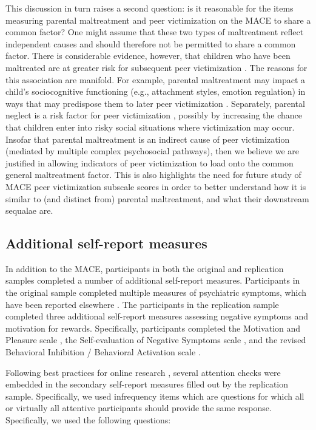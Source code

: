 \documentclass[letterpaper,man,natbib,longtable,floatsintext,12pt]{apa6}
\begin{document}
This discussion in turn raises a second question: is it reasonable for the items measuring parental maltreatment and peer victimization on the MACE to share a common factor? One might assume that these two types of maltreatment reflect independent causes and should therefore not be permitted to share a common factor. There is considerable evidence, however, that children who have been maltreated are at greater risk for subsequent peer victimization . The reasons for this association are manifold. For example, parental maltreatment may impact a child's sociocognitive functioning (e.g., attachment styles, emotion regulation) in ways that may predispose them to later peer victimization . Separately, parental neglect is a risk factor for peer victimization , possibly by increasing the chance that children enter into risky social situations where victimization may occur. Insofar that parental maltreatment is an indirect cause of peer victimization (mediated by multiple complex psychosocial pathways), then we believe we are justified in allowing indicators of peer victimization to load onto the common general maltreatment factor. This is also highlights the need for future study of MACE peer victimization subscale scores in order to better understand how it is similar to (and distinct from) parental maltreatment, and what their downstream sequalae are. 

\subsection*{Additional self-report measures}

In addition to the MACE, participants in both the original and replication samples completed a number of additional self-report measures. Participants in the original sample completed multiple measures of psychiatric symptoms, which have been reported elsewhere . The participants in the replication sample completed three additional self-report measures assessing negative symptoms and motivation for rewards. Specifically, participants completed the Motivation and Pleasure scale , the Self-evaluation of Negative Symptoms scale , and the revised Behavioral Inhibition / Behavioral Activation scale .

Following best practices for online research , several attention checks were embedded in the secondary self-report measures filled out by the replication sample. Specifically, we used infrequency items which are questions for which all  or virtually all attentive participants should provide the same response. Specifically, we used the following questions:
\end{document}
